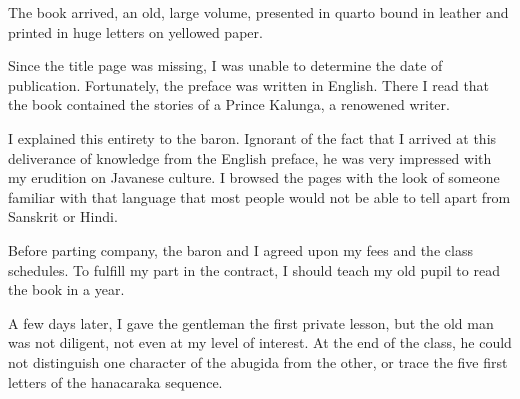 \documentclass[a4paper,12pt]{book}
\begin{document}
The book arrived, an old,
large volume, presented in
quarto bound in leather and printed in huge
letters on yellowed paper.

Since the title page
was missing, I was unable to determine
the date of publication. Fortunately,
the preface was written
in English. There I read that the book
contained the stories of a Prince Kalunga,
a renowened writer.

I explained this entirety to the baron.
Ignorant of the fact that I arrived at 
this deliverance of knowledge
from the English preface, he was
very impressed with my erudition on
Javanese culture. I browsed the pages
with the look of someone familiar
with that language that most people
would not be able to tell apart from
Sanskrit or Hindi.

Before parting company, the baron and I
agreed upon my fees
and the class schedules.
To fulfill my part in the contract,
I should teach my old pupil to read
the book in a year.

A few days later, I gave the gentleman
the first private lesson, but the old man
was not diligent, not even at my level
of interest. At the
end of the class, he could not distinguish
one character of the abugida from the other,
or trace the five first letters of the
hanacaraka sequence.
\end{document}
